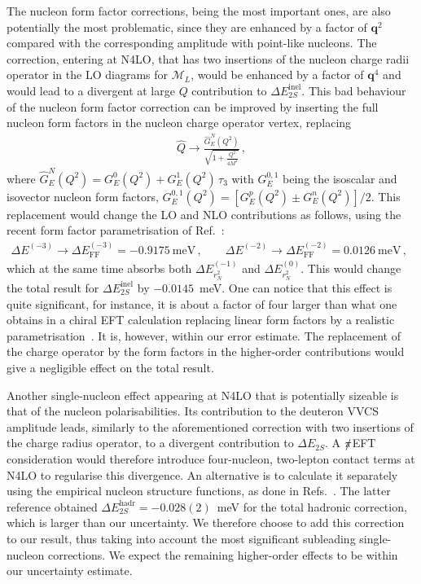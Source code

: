 \documentclass[prl,
twocolumn,
showpacs,preprintnumbers,amsmath,amssymb,
superscriptaddress,
a4paper,nofootinbib,longbibliography]{revtex4-2}
\def\bv#1{\boldsymbol{#1}}
\def\piEFT/{$\slashed{\pi}$EFT}
\begin{document}
The nucleon form factor corrections, being the most important ones, are also potentially the most problematic, since they are enhanced by a factor of $\bv{q}^2$ compared with the corresponding amplitude with point-like nucleons. The correction, entering at N4LO, that has two insertions of the nucleon charge radii operator in the LO diagrams for $\mathcal{M}_L$, would be enhanced by a factor of $\bv{q}^4$ and would lead to a divergent at large $Q$ contribution to $\Delta E_{2S}^\mathrm{inel}$.
This bad behaviour of the nucleon form factor correction can be improved by inserting the full nucleon form factors in the nucleon charge operator vertex, replacing
\begin{align}
\hat{Q}\to \frac{\hat{G}^N_E(Q^2)}{\sqrt{1+\frac{Q^2}{4M^2}}}\,,
\label{eq:nucleonFFs}
\end{align}
where $\hat{G}^N_E(Q^2)=G_E^{0}(Q^2)+G_E^1(Q^2)\,\tau_3$ with $G_E^{0,1}$ being the isoscalar and isovector nucleon form factors, $G_E^{0,1}(Q^2)=\left[G_E^p(Q^2)\pm G_E^n(Q^2)\right]/2$.
This replacement would change the LO and NLO contributions as follows, using the recent form factor parametrisation of Ref.~\cite{Borah:2020gte}:
\begin{align}
    \Delta E^{(-3)}\to\Delta E^{(-3)}_\mathrm{FF} =-0.9175~\text{meV}\,, \qquad 
    \Delta E^{(-2)}\to\Delta E^{(-2)}_\mathrm{FF} =0.0126~\text{meV}\,, \qquad 
\end{align}
which at the same time absorbs both $\Delta E^{(-1)}_{r_N^2}$ and $\Delta E^{(0)}_{r_N^2}$.
This would change the total result for $\Delta E_{2S}^\mathrm{inel}$ by $-0.0145$~meV. One can notice that this effect is quite significant, for instance, it is about a factor of four larger than what one obtains in a chiral EFT calculation replacing linear form factors by a realistic parametrisation~\cite{Acharya:2020bxf}. It is, however, within our error estimate. The replacement of the charge operator by the form factors in the higher-order contributions would give a negligible effect on the total result.

Another single-nucleon effect appearing at N4LO that is potentially sizeable is that of the nucleon polarisabilities. Its contribution to the deuteron VVCS amplitude leads, similarly to the aforementioned correction with two insertions of the charge radius operator, to a divergent contribution  to $\Delta E_{2S}$. A \piEFT/ consideration would therefore introduce four-nucleon, two-lepton contact terms at N4LO to regularise this divergence. An alternative is to calculate it separately using the empirical nucleon structure functions, as done in Refs.~\cite{Acharya:2020bxf,Carlson:2013xea}. The latter reference obtained $\Delta E_{2S}^\mathrm{hadr}=-0.028(2)$~meV for the total hadronic correction, which is larger than our uncertainty. We therefore choose to add this correction to our result, thus taking into account the most significant subleading single-nucleon corrections. We expect the remaining higher-order effects to be within our uncertainty estimate.
\end{document}
